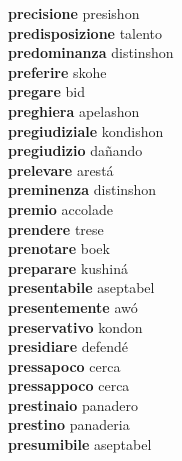 \textbf{precisione } presishon \\
\textbf{predisposizione } talento \\
\textbf{predominanza } distinshon \\
\textbf{preferire } skohe \\
\textbf{pregare } bid \\
\textbf{preghiera } apelashon \\
\textbf{pregiudiziale } kondishon \\
\textbf{pregiudizio } dañando \\
\textbf{prelevare } arestá \\
\textbf{preminenza } distinshon \\
\textbf{premio } accolade \\
\textbf{prendere } trese \\
\textbf{prenotare } boek \\
\textbf{preparare } kushiná \\
\textbf{presentabile } aseptabel \\
\textbf{presentemente } awó \\
\textbf{preservativo } kondon \\
\textbf{presidiare } defendé \\
\textbf{pressapoco } cerca \\
\textbf{pressappoco } cerca \\
\textbf{prestinaio } panadero \\
\textbf{prestino } panaderia \\
\textbf{presumibile } aseptabel \\
